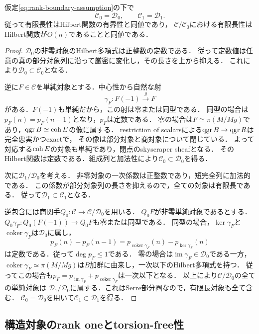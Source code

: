 \begin{theorem}\label{thm:elliptic-filtration}
仮定\eqref{eq:rank-boundary-assumption}の下で
\[
 \mathcal C_0=\mathcal D_0,\qquad
 \mathcal C_1=\mathcal D_1.
\]
従って有限長性はHilbert関数の有界性と同値であり，
$\mathcal C/\mathcal C_0$における有限長性はHilbert関数が$O(n)$であることと同値である．
\end{theorem}
\begin{proof}
$\mathcal D_0$の非零対象のHilbert多項式は正整数の定数である．
従って定数値は任意の真の部分対象列に沿って厳密に変化し，その長さを上から抑える．
これにより$\mathcal D_0\subset\mathcal C_0$となる．

逆に$F\in\mathcal C$を単純対象とする．中心性から自然な射
\[
 \gamma_F:F(-1)\xrightarrow{\,g\,}F
\]
がある．$F(-1)$も単純だから，この射は零または同型である．
同型の場合は$p_F(n)=p_F(n-1)$となり，$p_F$は定数である．
零の場合は$F\simeq\pi(M/Mg)$であり，$\operatorname{qgr} B\simeq\operatorname{coh} E$の像に属する．
restriction of scalarsによる$\operatorname{qgr} B\to\operatorname{qgr} R$は完全忠実かつexactで，
その像は部分対象と商対象について閉じている\cite[Corollary~2.8]{CKS}．
よって対応する$\operatorname{coh} E$の対象も単純であり，閉点のskyscraper sheafとなる．
そのHilbert関数は定数である．組成列と加法性により$\mathcal C_0\subset\mathcal D_0$を得る．

次に$\mathcal D_1/\mathcal D_0$を考える．
非零対象の一次係数は正整数であり，短完全列に加法的である．
この係数が部分対象列の長さを抑えるので，全ての対象は有限長である．
従って$\mathcal D_1\subset\mathcal C_1$となる．

逆包含には商関手$Q_0:\mathcal C\to\mathcal C/\mathcal D_0$を用いる．
$Q_0F$が非零単純対象であるとする．
$Q_0\gamma_F:Q_0(F(-1))\to Q_0F$も零または同型である．
同型の場合，$\ker\gamma_F$と$\operatorname{coker}\gamma_F$は$\mathcal D_0$に属し，
\[
 p_F(n)-p_F(n-1)=p_{\operatorname{coker}\gamma_F}(n)
                       -p_{\ker\gamma_F}(n)
\]
は定数である．従って$\deg p_F\leq1$である．
零の場合は$\operatorname{im}\gamma_F\in\mathcal D_0$である一方，
$\operatorname{coker}\gamma_F\simeq\pi(M/Mg)$は$B$加群に由来し，一次以下のHilbert多項式を持つ．
従ってこの場合も$p_F=p_{\operatorname{im}\gamma_F}+p_{\operatorname{coker}\gamma_F}$は一次以下となる．
以上により$\mathcal C/\mathcal D_0$の全ての単純対象は
$\mathcal D_1/\mathcal D_0$に属する．これはSerre部分圏なので，有限長対象も全て含む．
$\mathcal C_0=\mathcal D_0$を用いて$\mathcal C_1\subset\mathcal D_1$を得る．
\end{proof}

\subsection{構造対象のrank oneとtorsion-free性}

